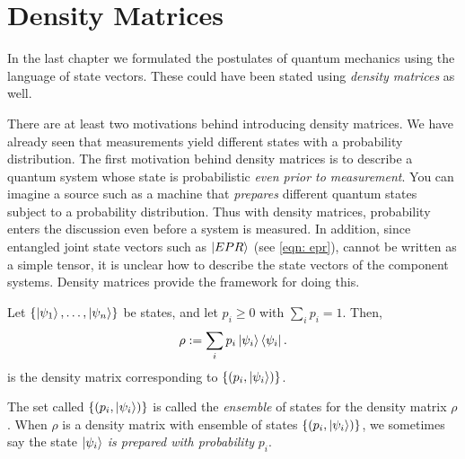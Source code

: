 
\chapter{Density Matrices} %

\label{Chapter4-density matrix} %


In the last chapter we formulated the postulates of quantum mechanics using the language of state vectors. These could have been stated using \textit{density matrices} as well. 

There are at least two motivations behind introducing density matrices. We have already seen that measurements yield different states with a probability distribution. The first motivation behind density matrices is to describe a quantum system whose state is probabilistic {\emph{even prior to measurement}}. You can imagine a source such as a machine that \emph{prepares} different quantum states subject to a probability distribution. Thus with density matrices, probability enters the discussion even before a system is measured.
In addition, since entangled joint state vectors such as $\ket{EPR}$ (see \eqref{eqn: epr}), cannot be written as a simple tensor, it is unclear how to describe the state vectors of the component systems.  Density matrices provide the framework for doing this. 




\begin{definition}
Let $\{\ket{\psi_1},\hdots,\ket{\psi_n}\}$ be states, and let $p_i\geq 0$ with $\sum\limits_i p_i=1$.
Then, 
\begin{equation}
    \rho:=\sum_i p_i \ket{\psi_i}\bra{\psi_i}.
\end{equation}
is the density matrix corresponding to $\{(p_i, \ket{\psi_i})\}$. 
\end{definition}
The set called $\{(p_i, \ket{\psi_i})\}$ is called the \textit{ensemble} of states for the density matrix $\rho$.  When $\rho$ is a density matrix with ensemble of states $\{(p_i, \ket{\psi_i})\}$, we sometimes say the state $\ket{\psi_i}$ {\emph{is prepared with probability}} $p_i$.

